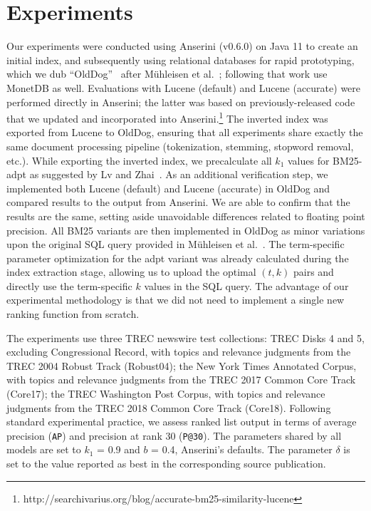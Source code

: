 \section{Experiments}
Our experiments were conducted using Anserini (v0.6.0) on Java 11 to create
an initial index, and subsequently using relational databases for rapid prototyping, which we dub ``OldDog''~\cite{olddog-docker} after M\"{u}hleisen et al.~\cite{OldDog}; following that work use MonetDB as well. Evaluations with Lucene (default) and Lucene (accurate) were performed directly in Anserini; the latter was based on previously-released code that we updated and incorporated into Anserini.\footnote{http://searchivarius.org/blog/accurate-bm25-similarity-lucene} The inverted index was exported from Lucene to OldDog, ensuring that all experiments share exactly the same document processing pipeline (tokenization, stemming, stopword removal, etc.). While exporting the inverted index, we precalculate all $k_1$ values for BM25-adpt as suggested by Lv and Zhai~\cite{bm25-adpt}. As an additional verification step, we implemented both Lucene (default) and Lucene (accurate) in OldDog and compared results to the output from Anserini. We are able to confirm that the results are the same, setting aside unavoidable differences related to floating point precision. All BM25 variants are then implemented in OldDog as minor variations upon the original SQL query provided in M\"{u}hleisen et al.~\cite{OldDog}. The term-specific parameter optimization for the adpt variant was already calculated during the index extraction stage, allowing us to upload the optimal $(t, k)$ pairs and directly use the term-specific $k$ values in the SQL query. The advantage of our experimental methodology is that we did not need to implement a single new ranking function from scratch. %

The experiments use three TREC newswire test collections: TREC Disks 4 and 5, excluding Congressional Record, with topics and relevance judgments from the TREC 2004 Robust Track (Robust04); the New York Times Annotated Corpus, with topics and relevance judgments from the TREC 2017 Common Core Track (Core17); the TREC Washington Post Corpus, with topics and relevance judgments from the TREC 2018 Common Core Track (Core18). Following standard experimental practice, we assess ranked list output in terms of average precision (\texttt{AP}) and precision at rank 30 (\texttt{P@30}). The parameters shared by all models are set to $k_1$ = 0.9 and $b$ = 0.4, Anserini’s defaults. The parameter $\delta$ is set to the value reported as best in the corresponding source publication. 


